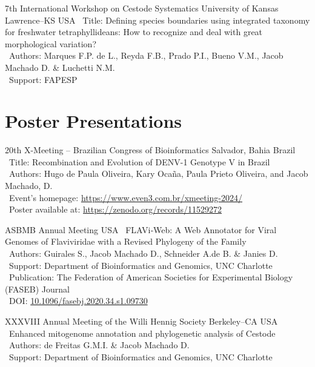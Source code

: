 \documentclass[11pt, letterpaper, sans]{moderncv}
\begin{document}
\vspace{.5em}

\cventry{---}
	{7th International Workshop on Cestode Systematics}
	{University of Kansas}
	{Lawrence--KS}
	{USA}
	{
		\textbullet~Title: Defining species boundaries using integrated taxonomy for freshwater tetraphyllideans: How to recognize and deal with great morphological variation?\\
		\textbullet~Authors: Marques F.P. de L., Reyda F.B., Prado P.I., Bueno V.M., Jacob Machado D. \& Luchetti N.M.\\
		\textbullet~Support: FAPESP
	}

\clearpage


\section{Poster Presentations}

    {20th X-Meeting – Brazilian Congress of Bioinformatics}
    {Salvador, Bahia}
    {Brazil}
    {}
    {
        \textbullet~Title: Recombination and Evolution of DENV-1 Genotype V in Brazil\\
        \textbullet~Authors: Hugo de Paula Oliveira, Kary Ocaña, Paula Prieto Oliveira, and Jacob Machado, D.\\
        \textbullet~Event's homepage: \url{https://www.even3.com.br/xmeeting-2024/}\\
        \textbullet~Poster available at: \url{https://zenodo.org/records/11529272}
    }

	{ASBMB Annual Meeting}
	{}
	{USA}
	{}
	{
		\textbullet~FLAVi‐Web: A Web Annotator for Viral Genomes of Flaviviridae with a Revised Phylogeny of the Family\\
		\textbullet~Authors: Guirales S.,  Jacob Machado D.,  Schneider A.de B. \&  Janies D.\\
		\textbullet~Support: Department of Bioinformatics and Genomics,  UNC Charlotte\\
		\textbullet~Publication: The Federation of American Societies for Experimental Biology (FASEB) Journal\\
		\textbullet~DOI: \href{https://doi.org/10.1096/fasebj.2020.34.s1.09730}{10.1096/fasebj.2020.34.s1.09730}
	}

\vspace{.5em}

	{XXXVIII Annual Meeting of the Willi Hennig Society}
	{Berkeley--CA}
	{USA}
	{}
	{
		\textbullet~Enhanced mitogenome annotation and phylogenetic analysis of Cestode\\
		\textbullet~Authors: de Freitas G.M.I. \& Jacob Machado D.\\
		\textbullet~Support: Department of Bioinformatics and Genomics,  UNC Charlotte
	}
\end{document}

